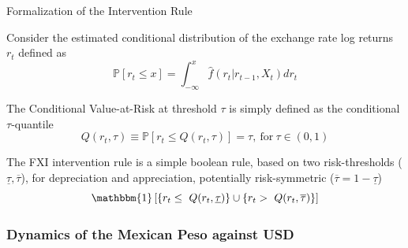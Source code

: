 \documentclass{beamer}
\newenvironment{largeitemize}{\itemize\addtolength{\itemsep}{10pt}}{\enditemize}
\begin{document}
\begin{frame}{Formalization of the Intervention Rule}
  \begin{largeitemize}
    \item Consider the estimated conditional distribution of the exchange rate log
      returns $r_t$ defined as
      \begin{equation*}
      \mathbb{P}[r_t \leq x] = \int_{-\infty}^{x}\hat{f}(r_t | r_{t-1}, X_t)
      dr_t        
      \end{equation*}
    \item The Conditional Value-at-Risk at threshold $\tau$ is simply defined as
      the conditional $\tau$-quantile
      \begin{equation*}
      Q(r_t, \tau) \equiv  \mathbb{P}[r_t
      \leq Q(r_t, \tau)] = \tau, \ \text{for} \ \tau \in (0,1)
      \end{equation*}        
    \item The FXI intervention rule is a simple boolean rule, based on two
      risk-thresholds ($\underline{\tau}, \overline{\tau}$), for depreciation
      and appreciation, potentially risk-symmetric ($\overline{\tau} = 1 - \underline{\tau}$)
      \begin{equation*}
\mathbbm{1} \left[ \{r_t \leq \ Q(r_t, \underline{\tau})\} \cup \{r_t > \
  Q(r_t, \overline{\tau})\} \right]
      \end{equation*}                
  \end{largeitemize}
  
\end{frame}

\begin{frame}
\frametitle{Dynamics of the Mexican Peso against USD}
\end{frame}
\end{document}
